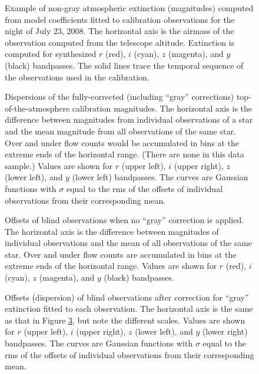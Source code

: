 \documentclass[manuscript]{aastex}
\begin{document}
\begin{figure}
\caption{Example of non-gray atmospheric extinction (magnitudes) 
   computed from model coefficients fitted to calibration observations for the night of July 23, 2008.
   The horizontal axis is the airmass of the observation computed from the telescope altitude.
   Extinction is computed for synthesized $r$ (red), $i$ (cyan), $z$ (magenta), and $y$ (black) bandpasses.
   The solid lines trace the temporal sequence of the observations used in the calibration. 
          \label{fig:calextc}}
\end{figure}

\begin{figure}
\caption{Dispersions of the fully-corrected (including ``gray'' corrections) top-of-the-atmosphere calibration magnitudes.
   The horizontal axis is the difference between magnitudes from individual observations of a star and the mean magnitude from all observations
   of the same star. Over and under flow counts would be accumulated in bins at the extreme ends of the horizontal range.
   (There are none in this data sample.)  Values are shown for $r$ (upper left), $i$ (upper right), $z$ (lower left),
   and $y$ (lower left) bandpasses.
   The curves are Gaussian functions with $\sigma$ equal to the rms of the offsets of individual observations from their corresponding mean.   
          \label{fig:calobs}}
\end{figure}

\begin{figure}
\caption{Offsets of blind observations when no ``gray'' correction is applied.
   The horizontal axis is the difference between magnitudes of individual observations and the mean
   of all observations of the same star.
   Over and under flow counts are accumulated in bins at the extreme ends of the horizontal range.
   Values are shown for $r$ (red), $i$ (cyan), $z$ (magenta), and $y$ (black) bandpasses.  
          \label{fig:blindobs_TOA}}
\end{figure}


\begin{figure}
\caption{Offsets (dispersion) of blind observations after correction for ``gray'' extinction fitted to each observation.
   The horizontal axis is the same as that in Figure \ref{fig:blindobs_TOA}, but note the different scales.
   Values are shown for $r$ (upper left), $i$ (upper right), $z$ (lower left), and $y$ (lower right) bandpasses.
   The curves are Gaussian functions with $\sigma$ equal to the rms of the offsets of individual observations from their corresponding mean.  
          \label{fig:blindobs_GC_TOA}}
\end{figure}
\end{document}
